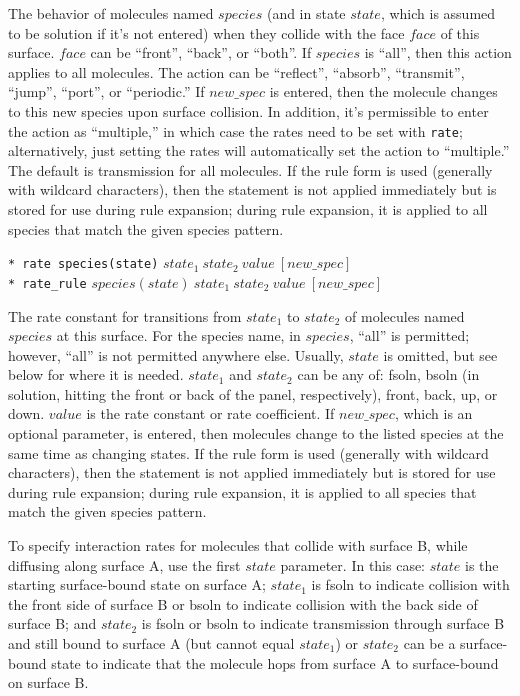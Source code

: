 \documentclass {scrbook}
\newcommand {\ttt} {\texttt}
\begin{document}
\begin{description}
The behavior of molecules named $species$ (and in state $state$, which is assumed to be solution if it's not entered) when they collide with the face $face$ of this surface. $face$ can be ``front'', ``back'', or ``both''. If $species$ is ``all'', then this action applies to all molecules. The action can be ``reflect'', ``absorb'', ``transmit'', ``jump'', ``port'', or ``periodic.'' If $new\_spec$ is entered, then the molecule changes to this new species upon surface collision. In addition, it's permissible to enter the action as ``multiple,'' in which case the rates need to be set with \ttt{rate}; alternatively, just setting the rates will automatically set the action to ``multiple.'' The default is transmission for all molecules. If the rule form is used (generally with wildcard characters), then the statement is not applied immediately but is stored for use during rule expansion; during rule expansion, it is applied to all species that match the given species pattern.

\item{\ttt{* rate species(state)} $state_1\ state_2\ value\ [new\_spec]$\\
\ttt{* rate\_rule} $species(state)\ state_1\ state_2\ value\ [new\_spec]$}

The rate constant for transitions from $state_1$ to $state_2$ of molecules named $species$ at this surface. For the species name, in $species$, ``all'' is permitted; however, ``all'' is not permitted anywhere else. Usually, $state$ is omitted, but see below for where it is needed. $state_1$ and $state_2$ can be any of: fsoln, bsoln (in solution, hitting the front or back of the panel, respectively), front, back, up, or down. $value$ is the rate constant or rate coefficient. If $new\_spec$, which is an optional parameter, is entered, then molecules change to the listed species at the same time as changing states. If the rule form is used (generally with wildcard characters), then the statement is not applied immediately but is stored for use during rule expansion; during rule expansion, it is applied to all species that match the given species pattern.

To specify interaction rates for molecules that collide with surface B, while diffusing along surface A, use the first $state$ parameter. In this case: $state$ is the starting surface-bound state on surface A; $state_1$ is fsoln to indicate collision with the front side of surface B or bsoln to indicate collision with the back side of surface B; and $state_2$ is fsoln or bsoln to indicate transmission through surface B and still bound to surface A (but cannot equal $state_1$) or $state_2$ can be a surface-bound state to indicate that the molecule hops from surface A to surface-bound on surface B.


\end{description}
\end{document}
